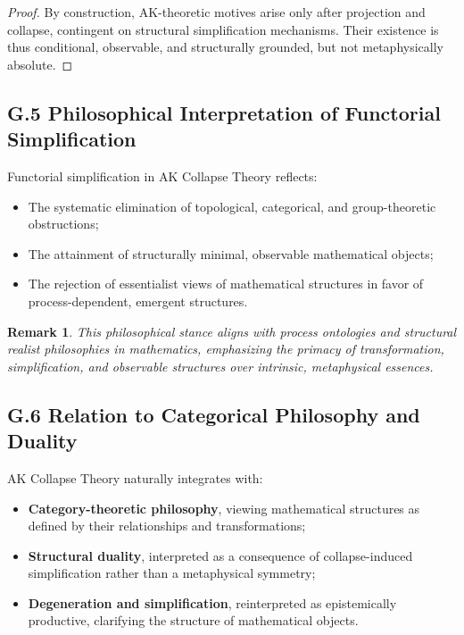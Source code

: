 \documentclass[11pt]{article}
\newtheorem{remark}[theorem]{Remark}
\begin{document}
\begin{proof}
By construction, AK-theoretic motives arise only after projection and collapse, contingent on structural simplification mechanisms. Their existence is thus conditional, observable, and structurally grounded, but not metaphysically absolute.
\end{proof}

\subsection*{G.5 Philosophical Interpretation of Functorial Simplification}

Functorial simplification in AK Collapse Theory reflects:

\begin{itemize}
    \item The systematic elimination of topological, categorical, and group-theoretic obstructions;
    \item The attainment of structurally minimal, observable mathematical objects;
    \item The rejection of essentialist views of mathematical structures in favor of process-dependent, emergent structures.
\end{itemize}

\begin{remark}
This philosophical stance aligns with process ontologies and structural realist philosophies in mathematics, emphasizing the primacy of transformation, simplification, and observable structures over intrinsic, metaphysical essences.
\end{remark}

\subsection*{G.6 Relation to Categorical Philosophy and Duality}

AK Collapse Theory naturally integrates with:

\begin{itemize}
    \item \textbf{Category-theoretic philosophy}, viewing mathematical structures as defined by their relationships and transformations;
    \item \textbf{Structural duality}, interpreted as a consequence of collapse-induced simplification rather than a metaphysical symmetry;
    \item \textbf{Degeneration and simplification}, reinterpreted as epistemically productive, clarifying the structure of mathematical objects.
\end{itemize}
\end{document}
